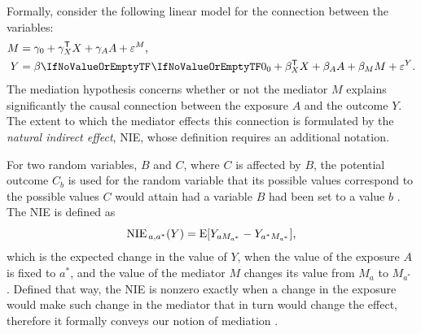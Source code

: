 \documentclass[ejs, twoside]{imsart}
\theoremstyle{plain}
\theoremstyle{remark}
\newcommand{\comma}{\text{,}}
\newcommand{\regerror}[1]{\varepsilon^{ \ifnum #1=1 M \else Y \fi}}
\newcommand{\transpose}[1]{#1^\mathsf{T} }
\numberwithin{equation}{section}
\numberwithin{table}{section}
\numberwithin{figure}{section}
\begin{document}
Formally, consider the following linear model for the connection between the variables:
\begin{equation} \label{eq:medregmodel}
	\begin{split}
		M &= \regcoefx{1}[0] + \transpose{\regcoefx{1}[X]} X + \regcoefx{1}[A] A + \regerror{1} \text{,} \\
		Y &= \regcoef{2}[][0] + \transpose{\regcoefx{2}[X]} X + \regcoefx{2}[A] A + \regcoefx{2}[M] M + \regerror{2} \text{.}
	\end{split}
\end{equation}
The mediation hypothesis concerns whether or not the mediator \(M\) explains significantly the causal connection between the exposure \(A\) and the outcome \(Y\). The extent to which the mediator effects this connection is formulated by the \emph{natural indirect effect}, NIE, whose definition requires an additional notation.

For two random variables, \(B\) and \(C\), where \(C\) is affected by \(B\), the potential outcome \(C_b\) is used for the random variable that its possible values correspond to the possible values \(C\) would attain had a variable \(B\) had been set to a value \(b\) \citep{pearl_direct_2001, pearl_causal_2009}. The NIE is defined as
\[\NIE = \mean{Y_{aM_{a^*}} - Y_{a^*M_{a^*}}} \comma \] 
which is the expected change in the value of \(Y\), when the value of the exposure \(A\) is fixed to \(a^*\), and the value of the mediator \(M\) changes its value from \(M_a\) to \(M_{a^*}\) \citep{robins_identifiability_1992, pearl_direct_2001,vanderweele_conceptual_2009}. Defined that way, the NIE is nonzero exactly when a change in the exposure would make such change in the mediator that in turn would change the effect, therefore it formally conveys our notion of mediation \citep{vanderweele_three-way_2013}.
\end{document}
